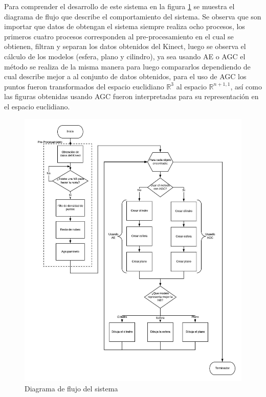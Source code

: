         
    Para comprender el desarrollo de este \gls{sistema} en la figura \ref{fig:mainDiagram} se muestra el diagrama de flujo que describe el comportamiento del sistema. Se observa que son importar que datos de obtengan el sistema siempre realiza ocho procesos, los primeros cuatro procesos corresponden al pre-procesamiento en el cual se obtienen, filtran y separan los datos obtenidos del Kinect, luego se observa el cálculo de los modelos (esfera, plano y cilindro), ya sea usando AE o AGC el método se realiza de la misma manera para luego compararlos dependiendo de cual describe mejor a al conjunto de datos obtenidos, para el uso de AGC los puntos fueron transformados del espacio euclidiano $\mathbb{R}^{3}$ al espacio $\mathbb{R}^{n+1,1}$, así como las figuras obtenidas usando AGC fueron interpretadas para su representación en el espacio euclidiano.
    \clearpage
    \begin{figure}[!htb]
       	\centering
       	\includegraphics[width=\textwidth]{02Desarrollo/RANSAC/imagenes/MainGiagram2.jpeg}
       	\caption{Diagrama de flujo del sistema} 
       	\label{fig:mainDiagram}
    \end{figure}